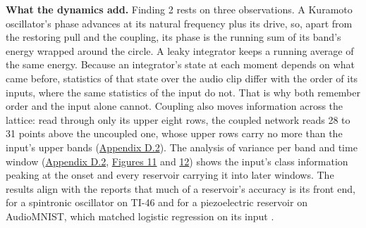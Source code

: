 \documentclass{article}
\begin{document}
\textbf{What the dynamics add.} Finding 2 rests on three observations. A
Kuramoto oscillator's phase advances at its natural frequency plus its
drive, so, apart from the restoring pull and the coupling, its phase is
the running sum of its band's energy wrapped around the circle. A leaky
integrator keeps a running average of the same energy. Because an
integrator's state at each moment depends on what came before,
statistics of that state over the audio clip differ with the order of
its inputs, where the same statistics of the input do not. That is why
both remember order and the input alone cannot. Coupling also moves
information across the lattice: read through only its upper eight rows,
the coupled network reads 28 to 31 points above the uncoupled one, whose
upper rows carry no more than the input's upper bands
(\hyperref[sec-D-2]{Appendix D.2}). The analysis of variance per band
and time window (\hyperref[sec-D-2]{Appendix D.2},
\hyperref[fig-fig11-appD2-class-information]{Figures 11} and
\hyperref[fig-fig12-appD2-class-information-seeds]{12}) shows the
input's class information peaking at the onset and every reservoir
carrying it into later windows. The results align with the reports that
much of a reservoir's accuracy is its front end, for a spintronic
oscillator on TI-46 \citep{abreu-araujo2020} and for a piezoelectric
reservoir on AudioMNIST, which matched logistic regression on its input
\citep{buckley2026}.
\end{document}
